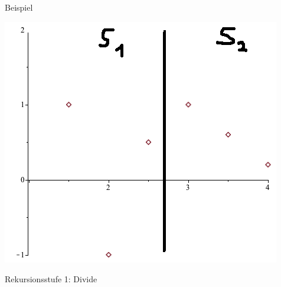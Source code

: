 \documentclass[18pt]{beamer}
\begin{document}
		\begin{frame}{Beispiel}
			\begin{minipage}{0.45\textwidth}
				\includegraphics[width =\textwidth]{logos/PlotsBetter01.png}
			\end{minipage}
			\begin{minipage}{0.45\textwidth}
				Rekursionsstufe 1: Divide		
			\end{minipage}
		\end{frame}
\end{document}
